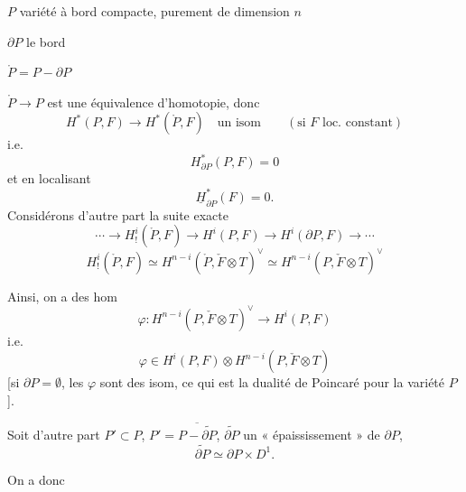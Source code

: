 \documentclass[11pt,a4paper]{article}
\begin{document}

$P$ variété à bord compacte, purement de dimension $n$

$\partial P$ le bord

$\mathring{P} = P - \partial P$

$\mathring{P} \longrightarrow P$ est une équivalence d'homotopie, donc
\[
  H^{*}(P, F) \longrightarrow H^{*}(\mathring{P}, F) \quad \text{un isom}
  \qquad (\text{si } F \text{ loc. constant})
\]
 i.e.
\[
  H^{*}_{\partial P}(P, F) = 0
\]
et en localisant
\[
  \underline{H}^{*}_{\partial P}(F) = 0 .
\]
Considérons d'autre part la suite exacte
\[
  \cdots \longrightarrow H^{i}_{!}(\mathring{P}, F) \longrightarrow H^{i}(P, F)
  \longrightarrow H^{i}(\partial P, F) \longrightarrow \cdots
\]
\[
  H^{i}_{!}(\mathring{P}, F) \simeq H^{n-i}(\mathring{P}, \check{F} \otimes T)^\vee
  \simeq H^{n-i}(P, \check{F} \otimes T)^\vee
\]

Ainsi, on a des hom
\[
  \varphi : H^{n-i}(P, \check{F} \otimes T)^\vee \longrightarrow H^{i}(P, F)
\]
i.e.
\[
  \varphi \in H^{i}(P, F) \otimes H^{n-i}(P, \check{F} \otimes T)
\]
[si $\partial P = \emptyset$, les $\varphi$ sont des isom, ce qui est la
dualité de Poincaré pour la variété  $P$].

Soit d'autre part $P' \subset P$, $P' = \overline{P - \widetilde{\partial P}}$,
$\widetilde{\partial P}$ un « épaississement » de $\partial P$,
\[
  \widetilde{\partial P} \simeq \partial P \times D^{1} .
\]

On a donc 



\end{document}
